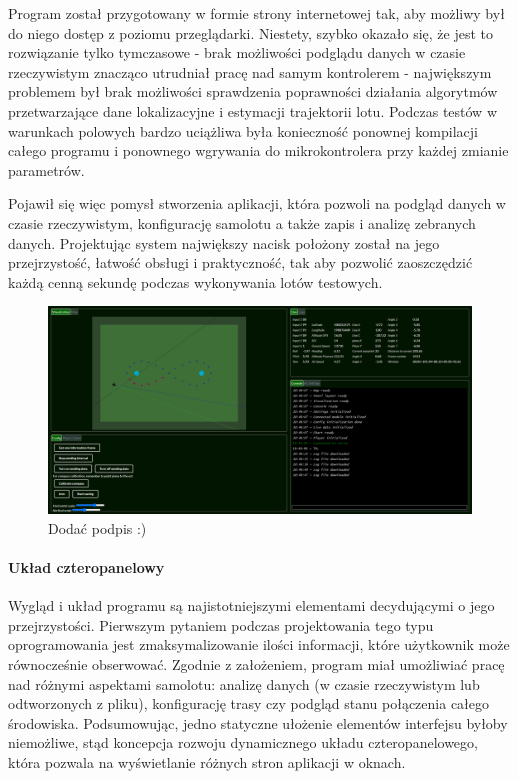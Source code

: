 \documentclass[12pt, a4paper]{article}
\begin{document}
Program został przygotowany w formie strony internetowej tak, aby możliwy był do niego dostęp z poziomu przeglądarki. Niestety, szybko okazało się, że jest to rozwiązanie tylko tymczasowe - brak możliwości podglądu danych w czasie rzeczywistym znacząco utrudniał pracę nad samym kontrolerem - największym problemem był brak możliwości sprawdzenia poprawności działania algorytmów przetwarzające dane lokalizacyjne i estymacji trajektorii lotu. Podczas testów w warunkach polowych bardzo uciążliwa była konieczność ponownej kompilacji całego programu i ponownego wgrywania do mikrokontrolera przy każdej zmianie parametrów. 

Pojawił się więc pomysł stworzenia aplikacji, która pozwoli na podgląd danych w czasie rzeczywistym, konfigurację samolotu a także zapis i analizę zebranych danych. Projektując system największy nacisk położony został na jego przejrzystość, łatwość obsługi i praktyczność, tak aby pozwolić zaoszczędzić każdą cenną sekundę podczas wykonywania lotów testowych. 

 \begin{figure}[ht]
    \centering
    \includegraphics[width=1\textwidth]{weball}
    \caption{Dodać podpis :)}
\end{figure}



\paragraph{Układ czteropanelowy}\mbox{}

Wygląd i układ programu są najistotniejszymi elementami decydującymi o jego przejrzystości. Pierwszym pytaniem podczas projektowania tego typu oprogramowania jest zmaksymalizowanie ilości informacji, które użytkownik może równocześnie obserwować. Zgodnie z założeniem, program  miał umożliwiać pracę nad różnymi aspektami samolotu: analizę danych (w czasie rzeczywistym lub odtworzonych z pliku), konfigurację trasy czy podgląd stanu połączenia całego środowiska. Podsumowując, jedno statyczne ułożenie elementów interfejsu byłoby niemożliwe, stąd koncepcja rozwoju dynamicznego układu czteropanelowego, która pozwala na wyświetlanie różnych stron aplikacji w oknach.
\end{document}
